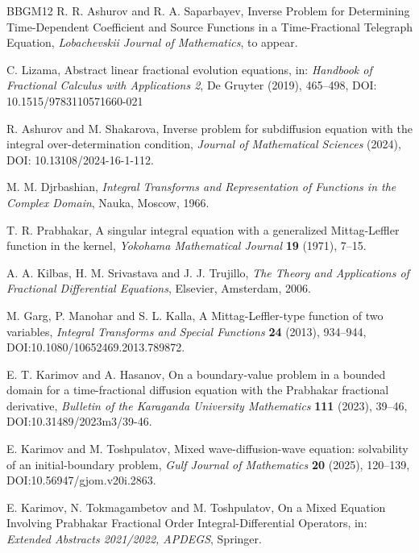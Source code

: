 \documentclass{amsart}
\numberwithin{equation}{section}
\begin{document}
\begin{thebibliography}{BBGM12}
R. R. Ashurov and R. A. Saparbayev, Inverse Problem for Determining Time-Dependent Coefficient and Source Functions in a Time-Fractional Telegraph Equation, \emph{Lobachevskii Journal of Mathematics}, to appear.

C. Lizama, Abstract linear fractional evolution equations, in: \emph{Handbook of Fractional Calculus with Applications 2}, De Gruyter (2019), 465--498, DOI: 10.1515/9783110571660-021

R. Ashurov and M. Shakarova, Inverse problem for subdiffusion equation with the integral over-determination condition, \emph{Journal of Mathematical Sciences} (2024), DOI: 10.13108/2024-16-1-112.

M. M. Djrbashian, \emph{Integral Transforms and Representation of Functions in the Complex Domain}, Nauka, Moscow, 1966.

T. R. Prabhakar, A singular integral equation with a generalized Mittag-Leffler function in the kernel, \emph{Yokohama Mathematical Journal} \textbf{19} (1971), 7--15.

A. A. Kilbas, H. M. Srivastava and J. J. Trujillo, \emph{The Theory and Applications of Fractional Differential Equations}, Elsevier, Amsterdam, 2006.

M. Garg, P. Manohar and S. L. Kalla, A Mittag-Leffler-type function of two variables, \emph{Integral Transforms and Special Functions} \textbf{24} (2013), 934--944, DOI:10.1080/10652469.2013.789872.

E. T. Karimov and A. Hasanov, On a boundary-value problem in a bounded domain for a time-fractional diffusion equation with the Prabhakar fractional derivative, \emph{Bulletin of the Karaganda University Mathematics} \textbf{111} (2023), 39--46, DOI:10.31489/2023m3/39-46.

E. Karimov and M. Toshpulatov, Mixed wave-diffusion-wave equation: solvability of an initial-boundary problem, \emph{Gulf Journal of Mathematics} \textbf{20} (2025), 120--139, DOI:10.56947/gjom.v20i.2863.

E. Karimov, N. Tokmagambetov and M. Toshpulatov, On a Mixed Equation Involving Prabhakar Fractional Order Integral-Differential Operators, in: \emph{Extended Abstracts 2021/2022, APDEGS}, Springer.


\end{thebibliography}
\end{document}

